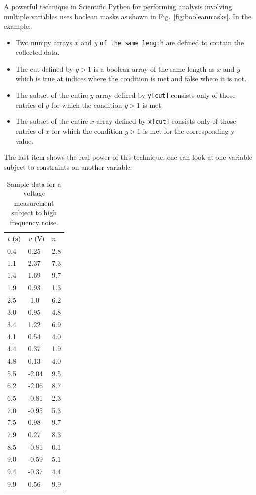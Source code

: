 A powerful technique in Scientific Python for performing analysis
involving multiple variables uses boolean masks as shown in
Fig.~\ref{fig:booleanmasks}.  In the example:
\begin{itemize}
\item Two numpy arrays $x$ and $y$ {\tt of the same length} are defined to contain the collected data.
\item The cut defined by $y > 1$ is a boolean array of the same length as $x$ and $y$ which is true at indices where the condition is met and false where it is not.
\item The subset of the entire $y$ array defined by {\tt y[cut]} consists only of those entries of $y$ for which the condition $y>1$ is met.
\item The subset of the entire $x$ array defined by {\tt x[cut]} consists only of those entries of $x$ for which the condition $y>1$ is met for the corresponding y value.
\end{itemize}
The last item shows the real power of this technique, one can look at one variable subject to constraints on another variable.

\begin{table}
\caption{Sample data for a voltage measurement subject to high frequency noise.}
\label{tbl:hfnoiseeg}
\begin{center}
\begin{tabular}{lll}
$t~(\rm s)$ & $v~(\rm V)$ & $n$ \\
0.4  & 0.25  &  2.8 \\
1.1  & 2.37  &  7.3 \\
1.4  & 1.69  &  9.7 \\
1.9  & 0.93  &  1.3 \\
2.5  & -1.0  &  6.2 \\
3.0  & 0.95  &  4.8 \\
3.4  & 1.22  &  6.9 \\
4.1  & 0.54  &  4.0 \\
4.4  & 0.37  &  1.9 \\
4.8  & 0.13  &  4.0 \\
5.5  & -2.04  &  9.5 \\
6.2  & -2.06  &  8.7 \\
6.5  & -0.81  &  2.3 \\
7.0  & -0.95  &  5.3 \\
7.5  & 0.98  &  9.7 \\
7.9  & 0.27  &  8.3 \\
8.5  & -0.81  &  0.1 \\
9.0  & -0.59  &  5.1 \\
9.4  & -0.37  &  4.4 \\
9.9  & 0.56  &  9.9 \\
\end{tabular}
\end{center}
\end{table}

